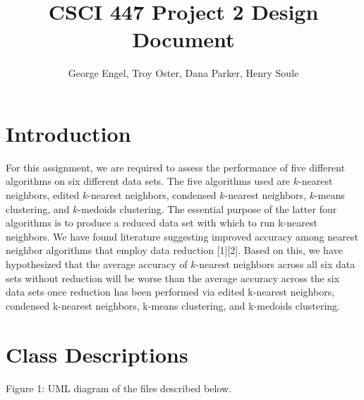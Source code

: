 \documentclass{article}
\title{CSCI 447 Project 2 Design Document}
\author{George Engel, Troy Oster, Dana Parker, Henry Soule}
\begin{document}
\maketitle

\section{Introduction} %
For this assignment, we are required to assess the performance of five different algorithms on six different data sets. The five algorithms used are $k$-nearest neighbors, edited $k$-nearest neighbors, condensed $k$-nearest neighbors, $k$-means clustering, and $k$-medoids clustering.  The essential purpose of the latter four algorithms is to produce a reduced data set with which to run k-nearest neighbors. We have found literature suggesting improved accuracy among nearest neighbor algorithms that employ data reduction [1][2].  Based on this, we have hypothesized that the average accuracy of $k$-nearest neighbors across all six data sets without reduction will be worse than the average accuracy across the six data sets once reduction has been performed via edited k-nearest neighbors, condensed k-nearest neighbors, k-means clustering, and k-medoids clustering.

\section{Class Descriptions}

\begin{center}
    \caption{\label{test} Figure 1: UML diagram of the files described below.}
\end{center}
\end{document}
